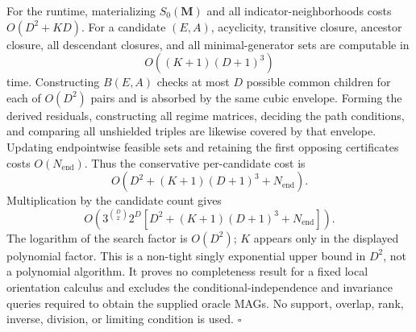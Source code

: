 For the runtime, materializing \(S_0(\mathbf M)\) and all indicator-neighborhoods costs \(O(D^2+KD)\).  For a candidate \((E,A)\), acyclicity, transitive closure, ancestor closure, all descendant closures, and all minimal-generator sets are computable in
\[
O((K+1)(D+1)^3)
\]
time.  Constructing \(B(E,A)\) checks at most \(D\) possible common children for each of \(O(D^2)\) pairs and is absorbed by the same cubic envelope.  Forming the derived residuals, constructing all regime matrices, deciding the path conditions, and comparing all unshielded triples are likewise covered by that envelope.  Updating endpointwise feasible sets and retaining the first opposing certificates costs \(O(N_{\mathrm{end}})\).  Thus the conservative per-candidate cost is
\[
O\!\left(D^2+(K+1)(D+1)^3+N_{\mathrm{end}}\right).
\]
Multiplication by the candidate count gives
\[
O\!\left(3^{\binom D2}2^D
\left[D^2+(K+1)(D+1)^3+N_{\mathrm{end}}\right]\right).
\]
The logarithm of the search factor is \(O(D^2)\); \(K\) appears only in the displayed polynomial factor.  This is a non-tight singly exponential upper bound in \(D^2\), not a polynomial algorithm.  It proves no completeness result for a fixed local orientation calculus and excludes the conditional-independence and invariance queries required to obtain the supplied oracle MAGs.  No support, overlap, rank, inverse, division, or limiting condition is used. \(\square\)